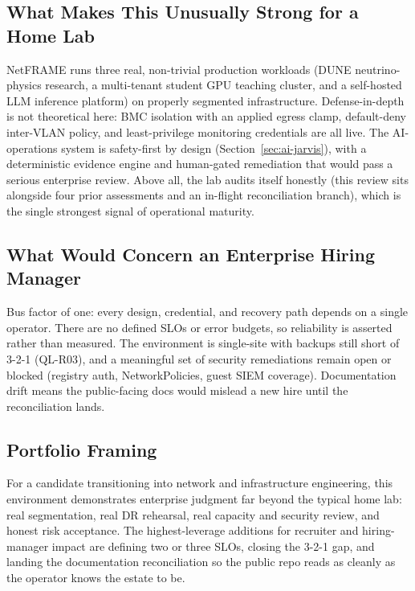 \subsection{What Makes This Unusually Strong for a Home Lab}

NetFRAME runs three real, non-trivial production workloads (DUNE neutrino-physics research, a multi-tenant student GPU teaching cluster, and a self-hosted LLM inference platform) on properly segmented infrastructure. Defense-in-depth is not theoretical here: BMC isolation with an applied egress clamp, default-deny inter-VLAN policy, and least-privilege monitoring credentials are all live. The AI-operations system is safety-first by design (Section~\ref{sec:ai-jarvis}), with a deterministic evidence engine and human-gated remediation that would pass a serious enterprise review. Above all, the lab audits itself honestly (this review sits alongside four prior assessments and an in-flight reconciliation branch), which is the single strongest signal of operational maturity.

\subsection{What Would Concern an Enterprise Hiring Manager}

Bus factor of one: every design, credential, and recovery path depends on a single operator. There are no defined SLOs or error budgets, so reliability is asserted rather than measured. The environment is single-site with backups still short of 3-2-1 (QL-R03), and a meaningful set of security remediations remain open or blocked (registry auth, NetworkPolicies, guest SIEM coverage). Documentation drift means the public-facing docs would mislead a new hire until the reconciliation lands.

\subsection{Portfolio Framing}

For a candidate transitioning into network and infrastructure engineering, this environment demonstrates enterprise judgment far beyond the typical home lab: real segmentation, real DR rehearsal, real capacity and security review, and honest risk acceptance. The highest-leverage additions for recruiter and hiring-manager impact are defining two or three SLOs, closing the 3-2-1 gap, and landing the documentation reconciliation so the public repo reads as cleanly as the operator knows the estate to be.
